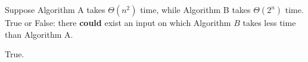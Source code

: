 \begin{prob}
    Suppose Algorithm A takes $\Theta(n^2)$ time, while Algorithm B takes
    $\Theta(2^n)$ time.
    True or False: there \textbf{could} exist an input on which
    Algorithm $B$ takes less time than Algorithm A.

        \Tf{}

        \begin{soln}
            True.
        \end{soln}

\end{prob}
